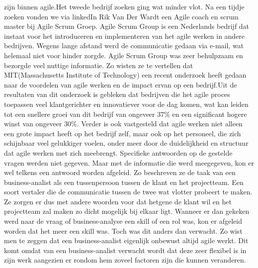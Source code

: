\documentclass{hogent-article}
\begin{document}
zijn binnen agile.\newline \newline Het tweede bedrijf zoeken ging wat minder vlot. Na een tijdje zoeken vonden we via linkedIn Rik Van Der Wardt een Agile coach en scrum master bij Agile Scrum Groep. Agile Scrum Group is een Nederlands bedrijf dat instaat voor het introduceren en implementeren van het agile werken in andere bedrijven. Wegens lange afstand werd de communicatie gedaan via e-mail, wat helemaal niet voor hinder zorgde. Agile Scrum Group was zeer behulpzaam en bezorgde veel nuttige informatie. Zo wisten ze te vertellen dat MIT(Massachusetts Institute of Technology) een recent onderzoek heeft gedaan naar de voordelen van agile werken en de impact ervan op een bedrijf.\newline \newline Uit de resultaten van dit onderzoek is gebleken dat bedrijven die het agile proces toepassen veel klantgerichter en innovatiever voor de dag komen, wat kan leiden tot een snellere groei van dit bedrijf van ongeveer 37\% en een significant hogere winst van ongeveer 30\%. \newline
\newline
Verder is ook vastgesteld dat agile werken niet alleen een grote impact heeft op het bedrijf zelf, maar ook op het personeel, die zich schijnbaar veel gelukkiger voelen, onder meer door de duidelijkheid en structuur dat agile werken met zich meebrengt.\newline
Specifieke antwoorden op de gestelde vragen werden niet gegeven. Maar met de informatie die werd meegegeven, kon er wel telkens een antwoord worden afgeleid. Zo beschreven ze de taak van een business-analist als een tussenpersoon tussen de klant en het projectteam. Een soort vertaler die de communicatie tussen de twee wat vlotter probeert te maken. Ze zorgen er dus met andere woorden voor dat hetgene de klant wil en het projectteam zal maken zo dicht mogelijk bij elkaar ligt. \newline
\newline
Wanneer er dan gekeken werd naar de vraag of business-analyse een skill of een rol was, kon er afgeleid worden dat het meer een skill was. Toch was dit anders dan verwacht. Zo wist men te zeggen dat een business-analist eigenlijk onbewust altijd agile werkt. Dit komt omdat van een business-analist verwacht wordt dat deze zeer flexibel is in zijn werk aangezien er rondom hem zoveel factoren zijn die kunnen veranderen.\newline
\newline
\end{document}
